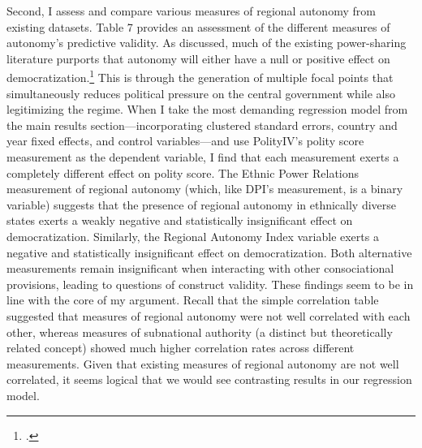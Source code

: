 \documentclass[12pt]{article}
\begin{document}
Second, I assess and compare various measures of regional autonomy from existing datasets. Table 7 provides an assessment of the different measures of autonomy's predictive validity. As discussed, much of the existing power-sharing literature purports that autonomy will either have a null or positive effect on democratization.\footcite{lijphart_consociational_1969, lijphart_consociational_1974, nordlinger_conflict_1972, norris_evidence_2008, kelly_power-sharing_2019, roeder_sustainable_2003} This is through the generation of multiple focal points that simultaneously reduces political pressure on the central government while also legitimizing the regime. When I take the most demanding regression model from the main results section---incorporating clustered standard errors, country and year fixed effects, and control variables---and use PolityIV's polity score measurement as the dependent variable, I find that each measurement exerts a completely different effect on polity score. The Ethnic Power Relations measurement of regional autonomy (which, like DPI's measurement, is a binary variable) suggests that the presence of regional autonomy in ethnically diverse states exerts a weakly negative and statistically insignificant effect on democratization. Similarly, the Regional Autonomy Index variable exerts a negative and statistically insignificant effect on democratization. Both alternative measurements remain insignificant when interacting with other consociational provisions, leading to questions of construct validity. These findings seem to be in line with the core of my argument. Recall that the simple correlation table suggested that measures of regional autonomy were not well correlated with each other, whereas measures of subnational authority (a distinct but theoretically related concept) showed much higher correlation rates across different measurements. Given that existing measures of regional autonomy are not well correlated, it seems logical that we would see contrasting results in our regression model.
\end{document}
